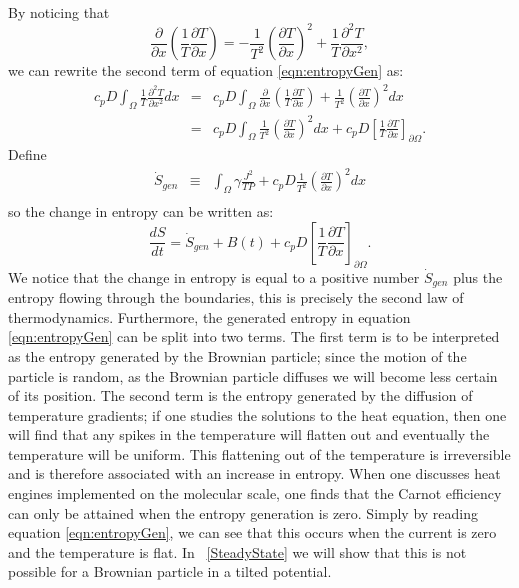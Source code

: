 By noticing that
\begin{equation}
\frac{\partial}{\partial x} \left(\frac{1}{T} \frac{\partial T}{\partial x} \right) = -\frac{1}{T^2} \left(\frac{\partial T}{\partial x} \right)^2 + \frac{1}{T} \frac{\partial^2 T}{\partial x^2},
\end{equation}
we can rewrite the second term of equation \ref{eqn:entropyGen} as:
\begin{eqnarray}
c_p D \int_{\Omega} \frac{1}{T} \frac{\partial^2 T}{\partial x^2} dx &=& c_p D \int_{\Omega} \frac{\partial}{\partial x} \left(\frac{1}{T} \frac{\partial T}{\partial x} \right) + \frac{1}{T^2} \left(\frac{\partial T}{\partial x} \right)^2 dx \\
 &=& c_p D \int_{\Omega} \frac{1}{T^2} \left(\frac{\partial T}{\partial x} \right)^2 dx + c_p D\left[\frac{1}{T} \frac{\partial T}{\partial x} \right]_{\partial \Omega}.
\end{eqnarray}
Define
\begin{eqnarray}
\dot{S}_{gen} &\equiv& \int_{\Omega} \gamma \frac{J^2}{T P} + c_p D \frac{1}{T^2} \left(\frac{\partial T}{\partial x} \right)^2 dx \label{eqn:entropyGen} \\
\end{eqnarray}
so the change in entropy can be written as:
\begin{equation}
\frac{d S}{d t} = \dot{S}_{gen} + B(t) + c_p D\left[\frac{1}{T} \frac{\partial T}{\partial x} \right]_{\partial \Omega}.
\end{equation}
We notice that the change in entropy is equal to a positive number $\dot{S}_{gen}$ plus the entropy flowing through the boundaries, this is precisely the second law of thermodynamics. Furthermore, the generated entropy in equation \ref{eqn:entropyGen} can be split into two terms. The first term is to be interpreted as the entropy generated by the Brownian particle; since the motion of the particle is random, as the Brownian particle diffuses we will become less certain of its position. The second term is the entropy generated by the diffusion of temperature gradients; if one studies the solutions to the heat equation, then one will find that any spikes in the temperature will flatten out and eventually the temperature will be uniform. This flattening out of the temperature is irreversible and is therefore associated with an increase in entropy. When one discusses heat engines implemented on the molecular scale, one finds that the Carnot efficiency can only be attained when the entropy generation is zero. Simply by reading equation \ref{eqn:entropyGen}, we can see that this occurs when the current is zero and the temperature is flat. In ~\autoref{SteadyState} we will show that this is not possible for a Brownian particle in a tilted potential. 

